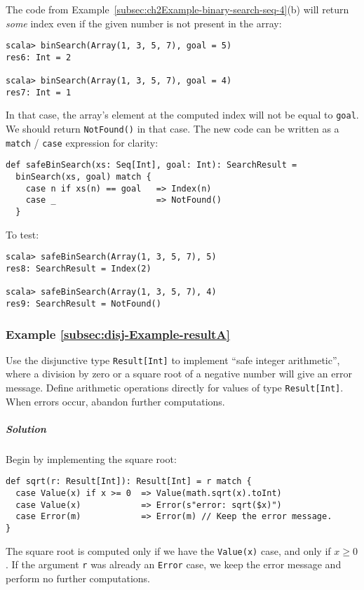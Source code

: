 The code from Example~\ref{subsec:ch2Example-binary-search-seq-4}(b)
will return \emph{some} index even if the given number is not present
in the array: 
\begin{lstlisting}
scala> binSearch(Array(1, 3, 5, 7), goal = 5)
res6: Int = 2

scala> binSearch(Array(1, 3, 5, 7), goal = 4)
res7: Int = 1
\end{lstlisting}
In that case, the array\textsf{'}s element at the computed index will not be
equal to \lstinline!goal!. We should return \lstinline!NotFound()!
in that case. The new code can be written as a \lstinline!match!
/ \lstinline!case! expression for clarity:
\begin{lstlisting}
def safeBinSearch(xs: Seq[Int], goal: Int): SearchResult =
  binSearch(xs, goal) match {
    case n if xs(n) == goal   => Index(n) 
    case _                    => NotFound()
  }
\end{lstlisting}
To test:
\begin{lstlisting}
scala> safeBinSearch(Array(1, 3, 5, 7), 5)
res8: SearchResult = Index(2)

scala> safeBinSearch(Array(1, 3, 5, 7), 4)
res9: SearchResult = NotFound()
\end{lstlisting}


\subsubsection{Example \label{subsec:disj-Example-resultA}\ref{subsec:disj-Example-resultA}}

Use the disjunctive type \lstinline!Result[Int]! to implement \textsf{``}safe
integer arithmetic\textsf{''}, where a division by zero or a square root of
a negative number will give an error message. Define arithmetic operations
directly for values of type \lstinline!Result[Int]!. When errors
occur, abandon further computations.

\subparagraph{Solution}

Begin by implementing the square root:
\begin{lstlisting}
def sqrt(r: Result[Int]): Result[Int] = r match {
  case Value(x) if x >= 0  => Value(math.sqrt(x).toInt)
  case Value(x)            => Error(s"error: sqrt($x)")
  case Error(m)            => Error(m) // Keep the error message.
}
\end{lstlisting}
The square root is computed only if we have the \lstinline!Value(x)!
case, and only if $x\geq0$. If the argument \lstinline!r! was already
an \lstinline!Error! case, we keep the error message and perform
no further computations.


